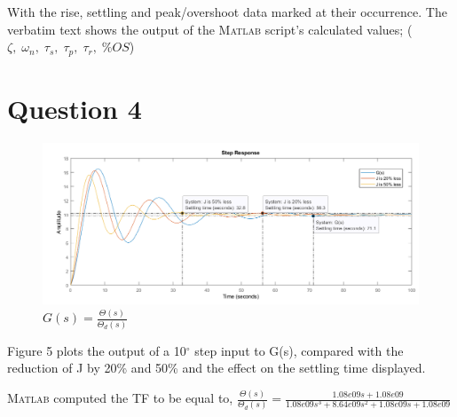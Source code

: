 \documentclass[a4paper,11pt]{article}
\newcommand{\matlab}{\textsc{Matlab }} %
\begin{document}
With the rise, settling and peak/overshoot data marked at their occurrence. The verbatim text shows the output of the \matlab script's calculated values; ($\zeta,\; \omega_{n},\; \tau_{s},\; \tau_{p},\; \tau_{r},\; \%OS$)

\section*{Question 4}
\begin{figure}[h]
        \centering
                \includegraphics[width=\linewidth]
                {inc/q4fig}
        \caption{$G(s) = \frac{\Theta(s)}{\Theta_{d}(s)}$}
\end{figure} 

Figure 5 plots the output of a 10$^\circ$ step input to G(s), compared with the reduction of J by 20\% and 50\% and the effect on the settling time displayed.

\matlab computed the TF to be equal to, $\frac{\Theta(s)}{\Theta_{d}(s)} = \frac{1.08e09 s + 1.08e09}{1.08e09 s^3 + 8.64e09 s^2 + 1.08e09 s + 1.08e09}$ 

\newpage
\end{document}
